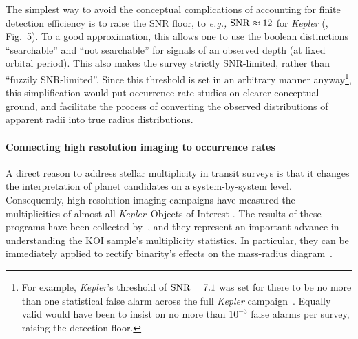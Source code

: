 \documentclass[12pt,modern]{aastex61}
\begin{document}
The simplest way to avoid the conceptual complications of accounting for 
finite detection efficiency is to raise the SNR floor, to {\it e.g.,} 
${\rm SNR} \approx 12$ for {\it Kepler} 
(\citealt{fulton_california-_2017}, Fig.~5).
To a good approximation, this allows one to use the boolean distinctions 
``searchable'' and ``not searchable'' for signals of an observed depth (at 
fixed orbital period).
This also makes the survey strictly SNR-limited, rather than ``fuzzily 
SNR-limited''.
Since this threshold is set in an arbitrary manner anyway\footnote{For 
    example, {\it Kepler}'s threshold of ${\rm SNR}=7.1$ was set for there to 
    be 
    no more than one statistical false alarm across the full {\it Kepler} 
    campaign~\citep{jenkins_tests_2002}. Equally valid would have been to 
    insist 
    on no more than $10^{-3}$ false alarms per survey, raising the detection 
    floor.
}, this simplification would put occurrence rate studies on 
clearer conceptual 
ground, and facilitate the process of converting the observed distributions
of apparent radii into true radius distributions.

\paragraph{Connecting high resolution imaging to occurrence rates}
A direct reason to address stellar multiplicity in transit surveys is that it 
changes the interpretation of planet candidates on a system-by-system level.
Consequently, high resolution imaging 
campaigns have measured the multiplicities of almost all {\it Kepler}\ Objects 
of Interest 
\citep{howell_speckle_2011,adams_adaptive_2012,adams_adaptive_2013,horch_observations_2012,
    horch_most_2014,lillo-box_multiplicity_2012,lillo-box_high-resolution_2014,dressing_adaptive_2014,
    law_robotic_2014,cartier_revision_2015,everett_high-resolution_2015,gilliland_hubble_2015,
    wang_influence_2015,wang_influence_2015-1,baranec_robo-ao_2016,ziegler_robo-ao_2017}.
The results of these programs have been collected 
by~\citet{furlan_kepler_2017}, and they represent an important advance in 
understanding the KOI 
sample's multiplicity statistics.
In particular, they can be immediately applied to rectify binarity's effects 
on the mass-radius diagram~\citep{furlan_densities_2017}.
\end{document}
